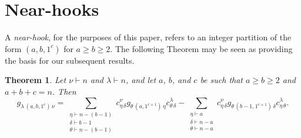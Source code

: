 \documentclass[12pt]{article}
\newtheorem{theorem}{Theorem}
\begin{document}
\section{Near-hooks}\label{secNear}
 A \emph{near-hook}, for the purposes of this paper, refers to an integer partition of the form $(a, b, 1^{c})$ for $a \geq b \geq 2$. The 
 following Theorem may be seen as providing the basis for our subsequent results. 
 
\begin{theorem}\label{fundamentaltheorem}
 Let $\nu \vdash n$ and $\lambda \vdash n$, and let $a$, $b$, and $c$ be such that $a \geq b \geq 2$ and $a + b + c = n$. Then 
 $$ g_{\lambda \, (a, b, 1^{c}) \, \nu} = \sum_{\substack{ \eta \vdash n - (b-1) \\ \delta \vdash b-1 \\ \theta \vdash n -(b-1) }} c_{\eta \, 
 \delta}^{\nu} g_{\theta \, (a, 1^{c+1}) \, \eta } c^{\lambda}_{\theta \, \delta} - \sum_{\substack{ \eta \vdash a \\ \delta \vdash n-a \\ 
 \theta \vdash n-a }} c_{\eta \, \delta}^{\nu} g_{\theta \, (b-1, 1^{c+1}) \, \delta } c^{\lambda}_{\eta \, \theta}. $$
\end{theorem}
\end{document}

